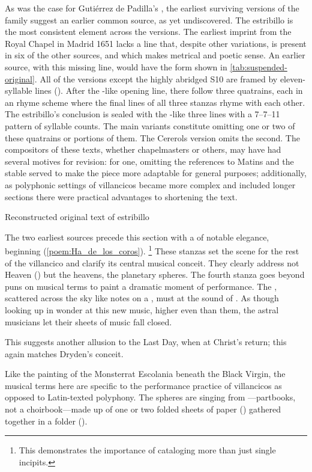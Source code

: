 As was the case for Gutiérrez de Padilla's , the earliest
surviving versions of the  family suggest an earlier
common source, as yet undiscovered.
The  estribillo is the most consistent element across
the versions.
The earliest imprint from the Royal Chapel in Madrid 1651 lacks a line that,
despite other variations, is present in six of the other sources, and which
makes metrical and poetic sense.
An earlier source, with this missing line, would have the form shown in
\cref{tab:suspended-original}.
All of the versions except the highly abridged S10 are framed by eleven-syllable
lines ().
After the -like opening line, there follow three quatrains, each
in an  rhyme scheme where the final lines of all three stanzas rhyme
with each other.
The estribillo's conclusion is sealed with the -like three lines with
a 7--7--11 pattern of syllable counts.
The main variants constitute omitting one or two of these quatrains or portions
of them.
The Cererols version omits the second.
The compositors of these texts, whether chapelmasters or others, may have had
several motives for revision: for one, omitting the references to Matins 
 and the stable served to make the piece more adaptable for
general purposes; additionally, as polyphonic settings of villancicos became
more complex and included longer sections there were practical advantages to
shortening the text.

{Reconstructed original text of  estribillo}

The two earliest sources precede this section with a  of notable
elegance, beginning 
(\cref{poem:Ha_de_los_coros}).%
    \footnote{This demonstrates the importance of cataloging more than just
    single incipits.}
These stanzas set the scene for the rest of the villancico and clarify its
central musical conceit.
They clearly address not Heaven () but the heavens, the
planetary spheres.
The fourth stanza goes beyond puns on musical terms to paint a dramatic moment
of performance.
The , scattered across the sky like notes on a , must  at the sound of .
As though looking up in wonder at this new music, higher even than them, the
astral musicians let their sheets of music fall closed.%
\begin{Footnote}
    This suggests another allusion to the Last Day, when  at Christ's return; this again matches Dryden's
    conceit.
\end{Footnote}
Like the painting of the Monsterrat Escolania beneath the Black Virgin, the
musical terms here are specific to the performance practice of villancicos as
opposed to Latin-texted polyphony.
The spheres are singing from ---partbooks, not a
choirbook---made up of one or two folded sheets of paper () gathered together in a folder ().

